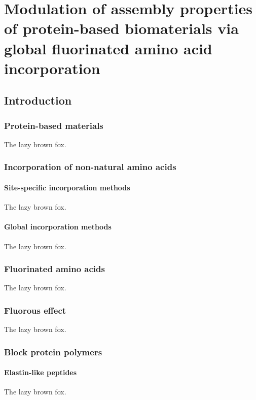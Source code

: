 \chapter{Modulation of assembly properties of protein-based biomaterials via
global fluorinated amino acid incorporation} 
\label{chap:lactose}

\begin{refsection}

\section{Introduction}

\subsection{Protein-based materials}
The lazy brown fox.

\subsection{Incorporation of non-natural amino acids}
\subsubsection{Site-specific incorporation methods}
The lazy brown fox.
\subsubsection{Global incorporation methods}
The lazy brown fox.

\subsection{Fluorinated amino acids}
The lazy brown fox.

\subsection{Fluorous effect}
The lazy brown fox.

\subsection{Block protein polymers}
\subsubsection{Elastin-like peptides}
The lazy brown fox.


\end{refsection}
